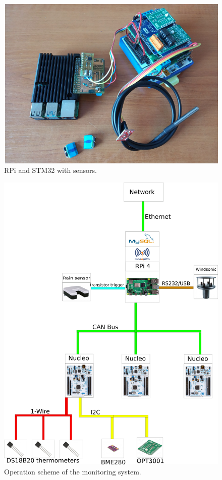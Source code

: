 \begin{figure}[H]
 \centering
 \includegraphics[scale = 0.5]{./pictures/Metostation}
 \caption{RPi and STM32 with sensors.}
 \label{MonNuc}
\end{figure}


\begin{figure}[H]
 \centering
 \includegraphics[scale = 0.3]{./pictures/monitoringScheme}
 \caption{Operation scheme of the monitoring system.}
 \label{opScheme}
\end{figure}




